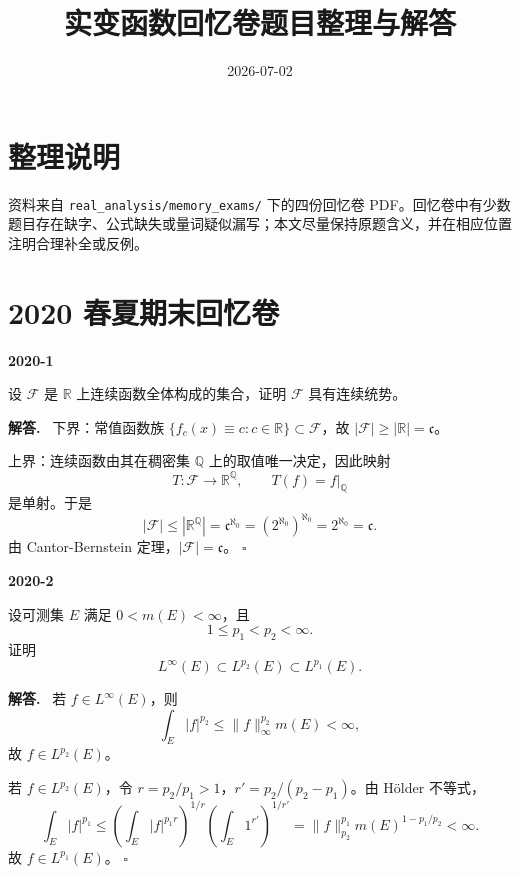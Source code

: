 \documentclass[UTF8]{ctexart}
\title{实变函数回忆卷题目整理与解答}
\author{}
\date{2026-07-02}
\newcommand{\R}{\mathbb R}
\newcommand{\Q}{\mathbb Q}
\newenvironment{problem}[1]{\par\medskip\noindent\textbf{#1}\par\smallskip}{\par}
\newenvironment{solution}{\par\noindent\textbf{解答.}\ }{\hfill$\square$\par\medskip}
\begin{document}
\maketitle
\tableofcontents
\newpage

\section*{整理说明}

资料来自 \texttt{real\_analysis/memory\_exams/} 下的四份回忆卷 PDF。回忆卷中有少数题目存在缺字、公式缺失或量词疑似漏写；本文尽量保持原题含义，并在相应位置注明合理补全或反例。

\section{2020 春夏期末回忆卷}

\begin{problem}{2020-1}
设 \(\mathcal F\) 是 \(\R\) 上连续函数全体构成的集合，证明 \(\mathcal F\) 具有连续统势。
\end{problem}
\begin{solution}
下界：常值函数族 \(\{f_c(x)\equiv c:c\in\R\}\subset\mathcal F\)，故
\(|\mathcal F|\ge|\R|=\mathfrak c\)。

上界：连续函数由其在稠密集 \(\Q\) 上的取值唯一决定，因此映射
\[
  T:\mathcal F\to\R^\Q,\qquad T(f)=f|_\Q
\]
是单射。于是
\[
  |\mathcal F|\le |\R^\Q|=\mathfrak c^{\aleph_0}=(2^{\aleph_0})^{\aleph_0}
  =2^{\aleph_0}=\mathfrak c.
\]
由 Cantor-Bernstein 定理，\(|\mathcal F|=\mathfrak c\)。
\end{solution}

\begin{problem}{2020-2}
设可测集 \(E\) 满足 \(0<m(E)<\infty\)，且
\[
  1\le p_1<p_2<\infty.
\]
证明
\[
  L^\infty(E)\subset L^{p_2}(E)\subset L^{p_1}(E).
\]
\end{problem}
\begin{solution}
若 \(f\in L^\infty(E)\)，则
\[
  \int_E |f|^{p_2}\le \|f\|_\infty^{p_2}m(E)<\infty,
\]
故 \(f\in L^{p_2}(E)\)。

若 \(f\in L^{p_2}(E)\)，令 \(r=p_2/p_1>1\)，\(r'=p_2/(p_2-p_1)\)。由 Hölder 不等式，
\[
  \int_E |f|^{p_1}
  \le \left(\int_E |f|^{p_1r}\right)^{1/r}
       \left(\int_E 1^{r'}\right)^{1/r'}
  = \|f\|_{p_2}^{p_1}m(E)^{1-p_1/p_2}<\infty.
\]
故 \(f\in L^{p_1}(E)\)。
\end{solution}
\end{document}
